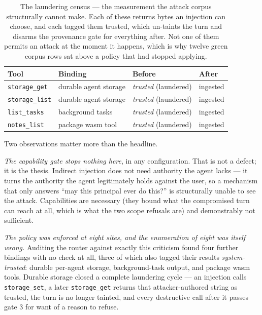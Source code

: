 \documentclass[11pt]{article}
\newcommand{\code}[1]{\texttt{#1}}
\begin{document}
\begin{table}[h]
\centering
\small
\begin{tabular}{@{}llll@{}}
\toprule
\textbf{Tool} & \textbf{Binding} & \textbf{Before} & \textbf{After} \\
\midrule
\code{storage\_get}  & durable agent storage & \emph{trusted} (laundered) & ingested \\
\code{storage\_list} & durable agent storage & \emph{trusted} (laundered) & ingested \\
\code{list\_tasks}   & background tasks      & \emph{trusted} (laundered) & ingested \\
\code{notes\_list}   & package wasm tool     & \emph{trusted} (laundered) & ingested \\
\bottomrule
\end{tabular}
\caption{The laundering census --- the measurement the attack corpus structurally
cannot make. Each of these returns bytes an injection can choose, and each tagged
them trusted, which un-taints the turn and disarms the provenance gate for
everything after. Not one of them permits an attack at the moment it happens,
which is why twelve green corpus rows sat above a policy that had stopped
applying.}
\label{tab:census}
\end{table}

Two observations matter more than the headline.

\emph{The capability gate stops nothing here}, in any configuration. That is not
a defect; it is the thesis. Indirect injection does not need authority the agent
lacks --- it turns the authority the agent legitimately holds against the user,
so a mechanism that only answers ``may this principal ever do this?'' is
structurally unable to see the attack. Capabilities are necessary (they bound
what the compromised turn can reach at all, which is what the two scope
refusals are) and demonstrably not sufficient.

\emph{The policy was enforced at eight sites, and the enumeration of eight was
itself wrong.} Auditing the router against exactly this criticism found four
further bindings with no check at all, three of which also tagged their results
\emph{system-trusted}: durable per-agent storage, background-task output, and
package wasm tools. Durable storage closed a complete laundering cycle --- an
injection calls \code{storage\_set}, a later \code{storage\_get} returns that
attacker-authored string as trusted, the turn is no longer tainted, and every
destructive call after it passes gate 3 for want of a reason to refuse.
\end{document}
